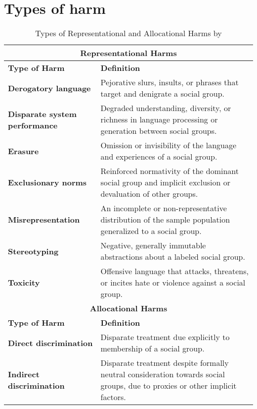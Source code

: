 

\chapter{Types of harm}
\label{appendix:types_of_harm}
\begin{table}[h!]
    \centering
    \renewcommand{\arraystretch}{1.3}
    \begin{tabular}{|p{4cm}|p{10cm}|}
        \hline
        \multicolumn{2}{|c|}{\textbf{Representational Harms}} \\
        \hline
        \textbf{Type of Harm} & \textbf{Definition} \\
        \hline
        \textbf{Derogatory language} & Pejorative slurs, insults, or phrases that target and denigrate a social group.\\
        \hline
        \textbf{Disparate system performance} & Degraded understanding, diversity, or richness in language processing or generation between social groups.
         \\
        \hline
        \textbf{Erasure} & Omission or invisibility of the language and experiences of a social group.
        \\
        \hline
        \textbf{Exclusionary norms} & Reinforced normativity of the dominant social group and implicit exclusion or devaluation of other groups.  \\
        \hline
        \textbf{Misrepresentation} & An incomplete or non-representative distribution of the sample population generalized to a social group. \\
        \hline
        \textbf{Stereotyping} & Negative, generally immutable abstractions about a labeled social group. \\
        \hline
        \textbf{Toxicity} & Offensive language that attacks, threatens, or incites hate or violence against a social group. \\
        \hline
        \multicolumn{2}{|c|}{\textbf{Allocational Harms}} \\
        \hline
        \textbf{Type of Harm} & \textbf{Definition} \\
        \hline
        \textbf{Direct discrimination} & Disparate treatment due explicitly to membership of a social group. \\
        \hline
        \textbf{Indirect discrimination} & Disparate treatment despite formally neutral consideration towards social groups, due to proxies or other implicit factors. \\
        \hline
    \end{tabular}
    \caption{Types of Representational and Allocational Harms by \citet[p.1103]{gallegos_bias_2024}}
    \label{tab:harms}
\end{table}
